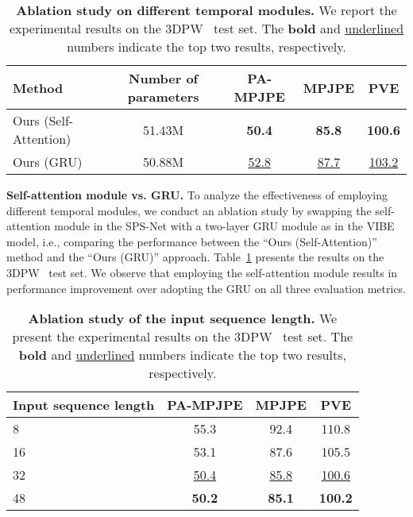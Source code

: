 \documentclass[times,referee,twocolumn,final,authoryear]{elsarticle}
\newcommand{\first}[1]{{\color{blue}\textbf{#1}}}
\newcommand{\second}[1]{{\color{red}\underline{#1}}}
\newcommand{\revised}[1]{{{#1}}}
\newcommand{\heading}[1]{\noindent\textbf{#1}}
\begin{document}
\begin{table}[t]
  \caption{
\textbf{Ablation study on different temporal modules.}
We report the experimental results on the 3DPW~\citep{3DPW} test set.
The \first{bold} and \second{underlined} numbers indicate the top two results, respectively.
  }
  \vspace{-6.0mm}
  \begin{center}
    \scriptsize
    \label{exp:ablation-self-attention}
    \resizebox{\linewidth}{!} 
    {
    \begin{tabular}{lcccc}
\toprule
Method & \revised{Number of parameters} & PA-MPJPE  & MPJPE  & PVE  \\
\midrule
Ours (Self-Attention) & 51.43M & \first{50.4} & \first{85.8} & \first{100.6} \\ 
Ours (GRU) & 50.88M & \second{52.8} & \second{87.7} & \second{103.2} \\
\bottomrule
\end{tabular}
    }
  \end{center}
  \vspace{-8.0mm}
\end{table}

\heading{Self-attention module vs. GRU.}
To analyze the effectiveness of employing different temporal modules, we conduct an ablation study by swapping the self-attention module  in the SPS-Net with a two-layer GRU module as in the VIBE~\citep{VIBE} model, i.e., comparing the performance between the ``Ours (Self-Attention)'' method and the ``Ours (GRU)'' approach.
Table~\ref{exp:ablation-self-attention} presents the results on the 3DPW~\citep{3DPW} test set.
We observe that employing the self-attention module results in performance improvement over adopting the GRU on all three evaluation metrics.

\begin{table}[t]
  \begin{center}
  \scriptsize
  \caption{
  \textbf{Ablation study of the input sequence length.}
We present the experimental results on the 3DPW~\citep{3DPW} test set.
The \first{bold} and \second{underlined} numbers indicate the top two results, respectively.
}
  \vspace{-2.0mm}
  \label{exp:ablation}
  \centering
{
  \begin{tabular}{lccc}
\toprule
Input sequence length & PA-MPJPE  & MPJPE  & PVE  \\
\midrule
8 & 55.3 & 92.4 & 110.8 \\
16 & 53.1 & 87.6 & 105.5 \\
32 & \second{50.4} & \second{85.8} & \second{100.6} \\ 
48 & \first{50.2} & \first{85.1} & \first{100.2} \\
\bottomrule
\end{tabular}
  }
  \end{center}
  \vspace{-8.0mm}
\end{table}
\end{document}

